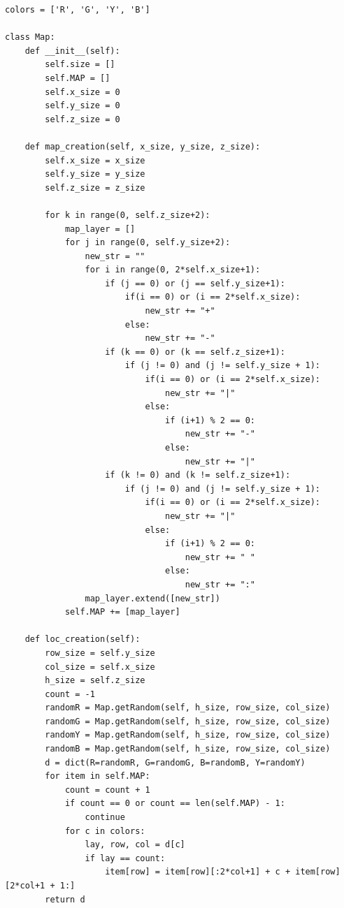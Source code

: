 \documentclass[a4paper]{report}
\theoremstyle{definition}
\theoremstyle{plain}
\theoremstyle{remark}
\theoremstyle{remark}
\theoremstyle{definition}
\begin{document}
\begin{lstlisting}[label=some-code,caption=map\_generation.py]
colors = ['R', 'G', 'Y', 'B']

class Map:
    def __init__(self):
        self.size = []
        self.MAP = []
        self.x_size = 0
        self.y_size = 0
        self.z_size = 0

    def map_creation(self, x_size, y_size, z_size):
        self.x_size = x_size
        self.y_size = y_size
        self.z_size = z_size

        for k in range(0, self.z_size+2):
            map_layer = []
            for j in range(0, self.y_size+2):
                new_str = ""
                for i in range(0, 2*self.x_size+1):
                    if (j == 0) or (j == self.y_size+1):
                        if(i == 0) or (i == 2*self.x_size):
                            new_str += "+"
                        else:
                            new_str += "-"
                    if (k == 0) or (k == self.z_size+1):
                        if (j != 0) and (j != self.y_size + 1):
                            if(i == 0) or (i == 2*self.x_size):
                                new_str += "|"
                            else:
                                if (i+1) % 2 == 0:
                                    new_str += "-"
                                else:
                                    new_str += "|"
                    if (k != 0) and (k != self.z_size+1):
                        if (j != 0) and (j != self.y_size + 1):
                            if(i == 0) or (i == 2*self.x_size):
                                new_str += "|"
                            else:
                                if (i+1) % 2 == 0:
                                    new_str += " "
                                else:
                                    new_str += ":"
                map_layer.extend([new_str])
            self.MAP += [map_layer]

    def loc_creation(self):
        row_size = self.y_size
        col_size = self.x_size
        h_size = self.z_size
        count = -1
        randomR = Map.getRandom(self, h_size, row_size, col_size)
        randomG = Map.getRandom(self, h_size, row_size, col_size)
        randomY = Map.getRandom(self, h_size, row_size, col_size)
        randomB = Map.getRandom(self, h_size, row_size, col_size)
        d = dict(R=randomR, G=randomG, B=randomB, Y=randomY)
        for item in self.MAP:
            count = count + 1
            if count == 0 or count == len(self.MAP) - 1:
                continue
            for c in colors:
                lay, row, col = d[c]
                if lay == count:
                    item[row] = item[row][:2*col+1] + c + item[row][2*col+1 + 1:]
        return d


\end{lstlisting}
\end{document}
